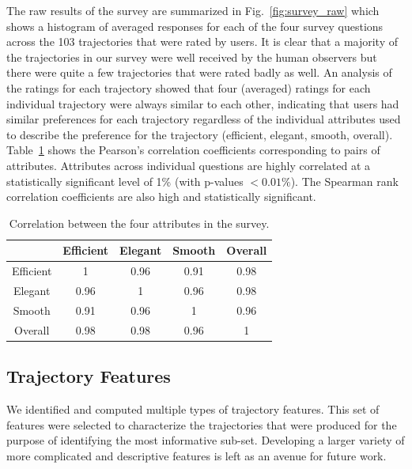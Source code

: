 \documentclass[letterpaper, 10 pt, conference]{ieeeconf}  %
\begin{document}
The raw results of the survey are summarized in Fig.~\ref{fig:survey_raw} which shows a histogram of averaged responses for each of the four survey questions across the 103 trajectories that were rated by users. It is clear that a majority of the trajectories in our survey were well received by the human observers but there were quite a few trajectories that were rated badly as well. An analysis of the ratings for each trajectory showed that four (averaged) ratings for each individual trajectory were always similar to each other, indicating that users had similar preferences for each trajectory regardless of the individual attributes used to describe the preference for the trajectory (efficient, elegant, smooth, overall). Table~\ref{tab:correlation} shows the Pearson's correlation coefficients corresponding to pairs of attributes. Attributes across individual questions are highly correlated at a statistically significant level of 1\% (with p-values $< 0.01\%$). The Spearman rank correlation coefficients are also high and statistically significant. 
\begin{table}
\centering
\begin{tabular}{|c|c|c|c|c|}
\hline
& Efficient & Elegant & Smooth & Overall \\ \hline
Efficient & 1 & 0.96 & 0.91 & 0.98 \\ \hline
Elegant & 0.96 & 1 & 0.96 & 0.98 \\ \hline
Smooth & 0.91 & 0.96 & 1 & 0.96 \\ \hline
Overall & 0.98 & 0.98 & 0.96 & 1 \\ \hline
\end{tabular}
\caption{Correlation between the four attributes in the survey.}
\label{tab:correlation}
\vspace{-0.1in}
\end{table}

\subsection{Trajectory Features}
\label{subsec:traj_feat}

We identified and computed multiple types of trajectory features. This set of features were selected to characterize the trajectories that were produced for the purpose of identifying the most informative sub-set. Developing a larger variety of more complicated and descriptive features is left as an avenue for future work.
\end{document}
